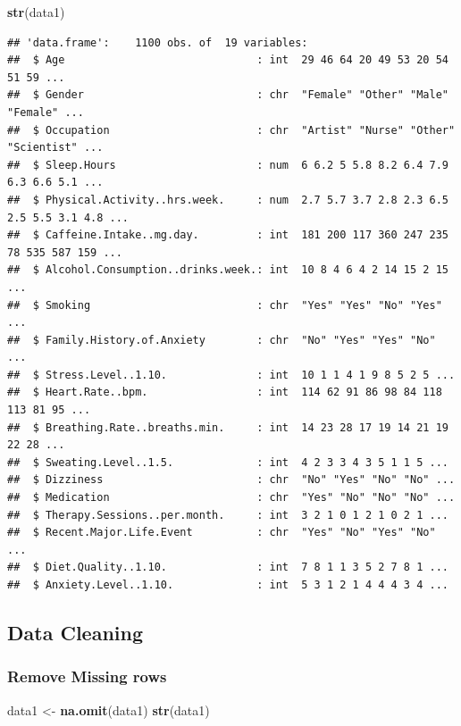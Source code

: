 \documentclass[
]{article}
\newenvironment{Shaded}{\begin{snugshade}}{\end{snugshade}}
\newcommand{\FunctionTok}[1]{\textcolor[rgb]{0.13,0.29,0.53}{\textbf{#1}}}
\newcommand{\NormalTok}[1]{#1}
\newcommand{\OtherTok}[1]{\textcolor[rgb]{0.56,0.35,0.01}{#1}}
\begin{document}
\begin{Shaded}
\begin{Highlighting}[]
\FunctionTok{str}\NormalTok{(data1)}
\end{Highlighting}
\end{Shaded}

\begin{verbatim}
## 'data.frame':    1100 obs. of  19 variables:
##  $ Age                              : int  29 46 64 20 49 53 20 54 51 59 ...
##  $ Gender                           : chr  "Female" "Other" "Male" "Female" ...
##  $ Occupation                       : chr  "Artist" "Nurse" "Other" "Scientist" ...
##  $ Sleep.Hours                      : num  6 6.2 5 5.8 8.2 6.4 7.9 6.3 6.6 5.1 ...
##  $ Physical.Activity..hrs.week.     : num  2.7 5.7 3.7 2.8 2.3 6.5 2.5 5.5 3.1 4.8 ...
##  $ Caffeine.Intake..mg.day.         : int  181 200 117 360 247 235 78 535 587 159 ...
##  $ Alcohol.Consumption..drinks.week.: int  10 8 4 6 4 2 14 15 2 15 ...
##  $ Smoking                          : chr  "Yes" "Yes" "No" "Yes" ...
##  $ Family.History.of.Anxiety        : chr  "No" "Yes" "Yes" "No" ...
##  $ Stress.Level..1.10.              : int  10 1 1 4 1 9 8 5 2 5 ...
##  $ Heart.Rate..bpm.                 : int  114 62 91 86 98 84 118 113 81 95 ...
##  $ Breathing.Rate..breaths.min.     : int  14 23 28 17 19 14 21 19 22 28 ...
##  $ Sweating.Level..1.5.             : int  4 2 3 3 4 3 5 1 1 5 ...
##  $ Dizziness                        : chr  "No" "Yes" "No" "No" ...
##  $ Medication                       : chr  "Yes" "No" "No" "No" ...
##  $ Therapy.Sessions..per.month.     : int  3 2 1 0 1 2 1 0 2 1 ...
##  $ Recent.Major.Life.Event          : chr  "Yes" "No" "Yes" "No" ...
##  $ Diet.Quality..1.10.              : int  7 8 1 1 3 5 2 7 8 1 ...
##  $ Anxiety.Level..1.10.             : int  5 3 1 2 1 4 4 4 3 4 ...
\end{verbatim}

\subsection{Data Cleaning}\label{data-cleaning}

\subsubsection{Remove Missing rows}\label{remove-missing-rows}

\begin{Shaded}
\begin{Highlighting}[]
\NormalTok{data1 }\OtherTok{\textless{}{-}} \FunctionTok{na.omit}\NormalTok{(data1)}
\FunctionTok{str}\NormalTok{(data1)}
\end{Highlighting}
\end{Shaded}
\end{document}
